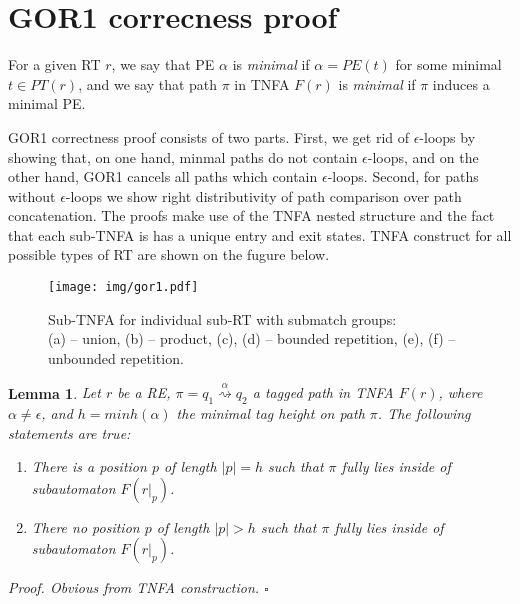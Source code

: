 \documentclass[AMA,STIX1COL]{WileyNJD-v2}
\newtheorem{XLem}{Lemma}
\begin{document}
\clearpage
\pagebreak

\section{GOR1 correcness proof}

For a given RT $r$,
we say that PE $\alpha$ is \emph{minimal} if $\alpha = PE(t)$ for some minimal $t \in PT(r)$,
and we say that path $\pi$ in TNFA $F(r)$ is \emph{minimal} if $\pi$ induces a minimal PE.

GOR1 correctness proof consists of two parts.
First, we get rid of $\epsilon$-loops by showing that,
on one hand, minmal paths do not contain $\epsilon$-loops,
and on the other hand, GOR1 cancels all paths which contain $\epsilon$-loops.
Second, for paths without $\epsilon$-loops we show right distributivity of path comparison over path concatenation.
The proofs make use of the TNFA nested structure
and the fact that each sub-TNFA is has a unique entry and exit states.
TNFA construct for all possible types of RT are shown on the fugure below.



\begin{figure}\label{fig_gor1}
\texttt{[image: img/gor1.pdf]}
\caption{
Sub-TNFA for individual sub-RT with submatch groups: \\
(a) -- union, (b) -- product, (c), (d) -- bounded repetition, (e), (f) -- unbounded repetition.
}
\end{figure}

    \begin{XLem}\label{gor1_path_containment}
    Let $r$ be a RE, $\pi = q_1 \overset {\alpha} {\rightsquigarrow} q_2$ a tagged path in TNFA $F(r)$,
    where $\alpha \neq \epsilon$,
    and $h = minh (\alpha)$ the minimal tag height on path $\pi$.
    The following statements are true:
    \begin{enumerate}
        \item There is a position $p$ of length $|p| = h$
            such that $\pi$ fully lies inside of subautomaton $F(r|_p)$.

        \item There no position $p$ of length $|p| > h$
            such that $\pi$ fully lies inside of subautomaton $F(r|_p)$.
    \end{enumerate}
    Proof.
    Obvious from TNFA construction.
    $\square$
    \end{XLem}
\end{document}

